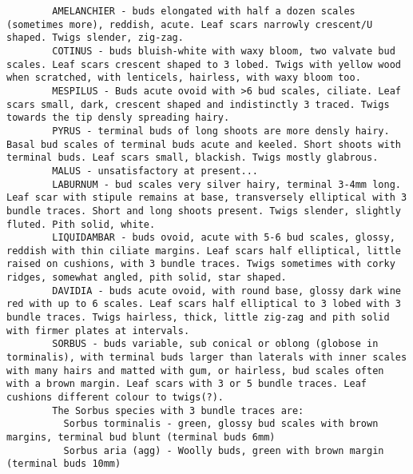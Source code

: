 \documentclass[openany]{book}
\begin{document}
\begin{verbatim}
        AMELANCHIER - buds elongated with half a dozen scales (sometimes more), reddish, acute. Leaf scars narrowly crescent/U shaped. Twigs slender, zig-zag.
        COTINUS - buds bluish-white with waxy bloom, two valvate bud scales. Leaf scars crescent shaped to 3 lobed. Twigs with yellow wood when scratched, with lenticels, hairless, with waxy bloom too.
        MESPILUS - Buds acute ovoid with >6 bud scales, ciliate. Leaf scars small, dark, crescent shaped and indistinctly 3 traced. Twigs towards the tip densly spreading hairy.
        PYRUS - terminal buds of long shoots are more densly hairy. Basal bud scales of terminal buds acute and keeled. Short shoots with terminal buds. Leaf scars small, blackish. Twigs mostly glabrous.
        MALUS - unsatisfactory at present...
        LABURNUM - bud scales very silver hairy, terminal 3-4mm long. Leaf scar with stipule remains at base, transversely elliptical with 3 bundle traces. Short and long shoots present. Twigs slender, slightly fluted. Pith solid, white.
        LIQUIDAMBAR - buds ovoid, acute with 5-6 bud scales, glossy, reddish with thin ciliate margins. Leaf scars half elliptical, little raised on cushions, with 3 bundle traces. Twigs sometimes with corky ridges, somewhat angled, pith solid, star shaped.
        DAVIDIA - buds acute ovoid, with round base, glossy dark wine red with up to 6 scales. Leaf scars half elliptical to 3 lobed with 3 bundle traces. Twigs hairless, thick, little zig-zag and pith solid with firmer plates at intervals.
        SORBUS - buds variable, sub conical or oblong (globose in torminalis), with terminal buds larger than laterals with inner scales with many hairs and matted with gum, or hairless, bud scales often with a brown margin. Leaf scars with 3 or 5 bundle traces. Leaf cushions different colour to twigs(?).
        The Sorbus species with 3 bundle traces are:
          Sorbus torminalis - green, glossy bud scales with brown margins, terminal bud blunt (terminal buds 6mm)
          Sorbus aria (agg) - Woolly buds, green with brown margin (terminal buds 10mm)
\end{verbatim}
\end{document}
